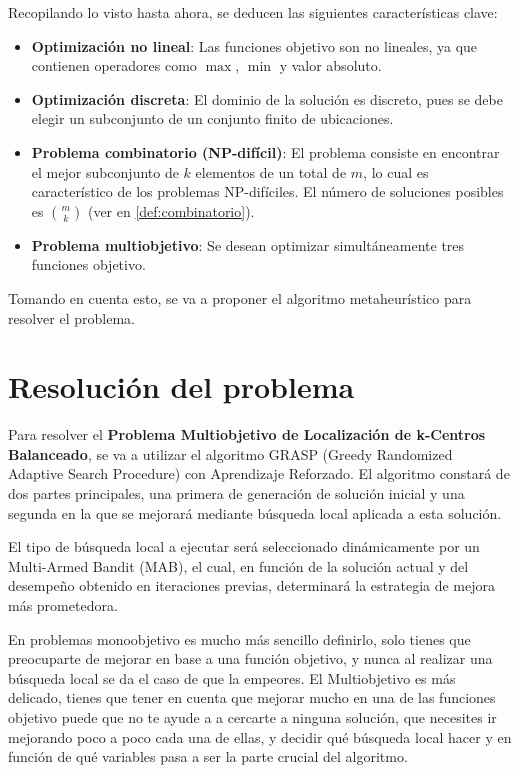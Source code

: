 \documentclass[12pt,a4paper]{book}
\begin{document}
Recopilando lo visto hasta ahora, se deducen las siguientes características clave:

\begin{itemize}
    \item \textbf{Optimización no lineal}: Las funciones objetivo son no lineales, ya que contienen operadores como $\max$, $\min$ y valor absoluto.
    
    \item \textbf{Optimización discreta}: El dominio de la solución es discreto, pues se debe elegir un subconjunto de un conjunto finito de ubicaciones.
    
    \item \textbf{Problema combinatorio (NP-difícil)}: El problema consiste en encontrar el mejor subconjunto de $k$ elementos de un total de $m$, lo cual es característico de los problemas NP-difíciles. El número de soluciones posibles es $\binom{m}{k}$ (ver en \ref{def:combinatorio}).
    
    \item \textbf{Problema multiobjetivo}: Se desean optimizar simultáneamente tres funciones objetivo.
\end{itemize}

Tomando en cuenta esto, se va a proponer el algoritmo metaheurístico para resolver el problema.


\chapter{Resolución del problema}
Para resolver el \textbf{Problema Multiobjetivo de Localización de k-Centros Balanceado}, se va a utilizar el algoritmo GRASP (Greedy Randomized Adaptive Search Procedure) con Aprendizaje Reforzado.
El algoritmo constará de dos partes principales, una primera de generación de solución inicial y una segunda en la que se mejorará mediante búsqueda local aplicada a esta solución.

El tipo de búsqueda local a ejecutar será seleccionado dinámicamente por un Multi-Armed Bandit (MAB), el cual, en función de la solución actual y del desempeño obtenido en iteraciones previas, determinará la estrategia de mejora más prometedora.

En problemas monoobjetivo es mucho más sencillo definirlo, solo tienes que preocuparte de mejorar en base a una función objetivo, y nunca al realizar una búsqueda local se da el caso de que la empeores. El Multiobjetivo es más delicado,
tienes que tener en cuenta que mejorar mucho en una de las funciones objetivo puede que no te ayude a a cercarte a ninguna solución, que necesites ir mejorando poco a poco cada una de ellas, y decidir qué búsqueda local hacer y en función de qué variables pasa
a ser la parte crucial del algoritmo.
\end{document}
